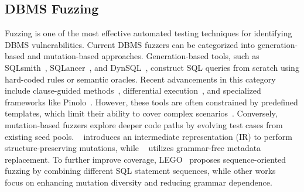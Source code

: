 \documentclass[sigconf,review,anonymous]{acmart}
\begin{document}
\subsection{DBMS Fuzzing}
Fuzzing is one of the most effective automated testing techniques for identifying DBMS vulnerabilities.
Current DBMS fuzzers can be categorized into generation-based and mutation-based approaches. Generation-based tools, such as SQLsmith~\cite{sqlsmith}, SQLancer~\cite{sqlancer, rigger2020testing}, and DynSQL~\cite{jiang2023dynsql}, construct SQL queries from scratch using hard-coded rules or semantic oracles. Recent advancements in this category include clause-guided methods~\cite{wei2024sqlaser, ba2023testing}, differential execution~\cite{song2023testing, cui2022differentially}, and specialized frameworks like Pinolo~\cite{hao2023pinolo}. However, these tools are often constrained by predefined templates, which limit their ability to cover complex scenarios~\cite{gao2023comprehensive}. Conversely, mutation-based fuzzers explore deeper code paths by evolving test cases from existing seed pools. 
\squirrel{}~\cite{zhong2020squirrel} introduces an intermediate representation (IR) to perform structure-preserving mutations, while \griffin{}~\cite{fu2022griffin} utilizes grammar-free metadata replacement. 
To further improve coverage, LEGO~\cite{liang2023sequence} proposes sequence-oriented fuzzing by combining different SQL statement sequences, while other works~\cite{yang2024towards} focus on enhancing mutation diversity and reducing grammar dependence. 
\end{document}
